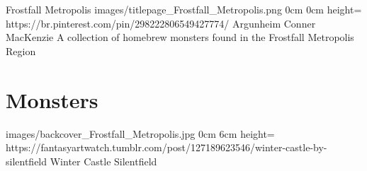 \documentclass[letterpaper,openany,twoside,twocolumn]{book}
\begin{document}
	\bookTitlePage
		{Frostfall Metropolis}
		{images/titlepage_Frostfall_Metropolis.png}
		{0cm}
		{0cm}
		{height=\paperheight}
		{https://br.pinterest.com/pin/298222806549427774/}
		{Argunheim}
		{Conner MacKenzie}
		{A collection of homebrew monsters found in the Frostfall Metropolis Region}
	
	\tableofcontents
	
	\mainmatter
	
	\MonsterSheetGeometry
	\part{Monsters}
	
	
	\bookLastPage
		{images/backcover_Frostfall_Metropolis.jpg}
		{0cm}
		{6cm}
		{height=\paperheight}
		{https://fantasyartwatch.tumblr.com/post/127189623546/winter-castle-by-silentfield}
		{Winter Castle}
		{Silentfield}
		{}
\end{document}
